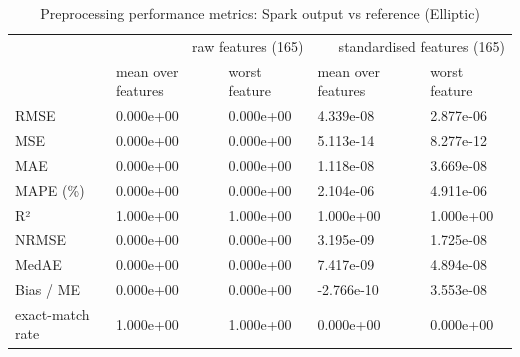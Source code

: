 \begin{table}
\caption{Preprocessing performance metrics: Spark output vs reference (Elliptic)}
\label{tab:01_preprocessing_metrics}
\begin{tabular}{lllll}
\toprule
 & \multicolumn{2}{r}{raw features (165)} & \multicolumn{2}{r}{standardised features (165)} \\
 & mean over features & worst feature & mean over features & worst feature \\
\midrule
RMSE & 0.000e+00 & 0.000e+00 & 4.339e-08 & 2.877e-06 \\
MSE & 0.000e+00 & 0.000e+00 & 5.113e-14 & 8.277e-12 \\
MAE & 0.000e+00 & 0.000e+00 & 1.118e-08 & 3.669e-08 \\
MAPE (\%) & 0.000e+00 & 0.000e+00 & 2.104e-06 & 4.911e-06 \\
R² & 1.000e+00 & 1.000e+00 & 1.000e+00 & 1.000e+00 \\
NRMSE & 0.000e+00 & 0.000e+00 & 3.195e-09 & 1.725e-08 \\
MedAE & 0.000e+00 & 0.000e+00 & 7.417e-09 & 4.894e-08 \\
Bias / ME & 0.000e+00 & 0.000e+00 & -2.766e-10 & 3.553e-08 \\
exact-match rate & 1.000e+00 & 1.000e+00 & 0.000e+00 & 0.000e+00 \\
\bottomrule
\end{tabular}
\end{table}
